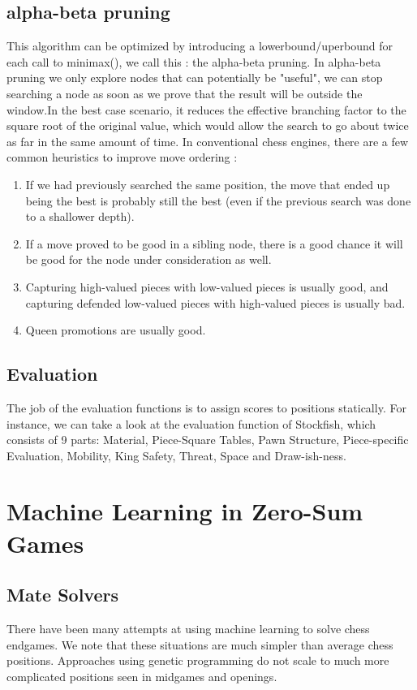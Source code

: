 \documentclass[12pt, a4paper]{report}
\begin{document}
			\subsection{alpha-beta pruning}
			This algorithm can be optimized by introducing a lowerbound/uperbound for each call to minimax(), we call this : the alpha-beta pruning.
			In alpha-beta pruning we only explore nodes that can potentially be "useful", we can stop searching a node as soon as we prove that the result will be outside the window.In the best case scenario, it reduces the effective branching factor to the square root of the original value, which would allow the search to go about twice as far in the same amount of time.
			In conventional chess engines, there are a few common heuristics to improve move ordering :
				\begin{enumerate}
					\item If we had previously searched the same position, the move that ended up being the best is probably still the best (even if the previous search was done to a shallower depth).
					\item If a move proved to be good in a sibling node, there is a good chance it will be good for the node under consideration as well.
					\item Capturing high-valued pieces with low-valued pieces is usually good, and capturing defended low-valued pieces with high-valued pieces is usually bad.
					\item Queen promotions are usually good.
				\end{enumerate}
			\subsection{Evaluation}
			The job of the evaluation functions is to assign scores to positions statically.
			For instance, we can take a look at the evaluation function of Stockfish, which consists of 9 parts: Material, Piece-Square Tables, Pawn Structure, Piece-specific Evaluation, Mobility, King Safety, Threat, Space and Draw-ish-ness.
		
		\section{Machine Learning in Zero-Sum Games}
			\subsection{Mate Solvers}
			There have been many attempts at using machine learning to solve chess endgames.
			We note that these situations are much simpler than average chess positions. Approaches using genetic programming do not scale to much more complicated positions seen in midgames and openings.	
\end{document}
